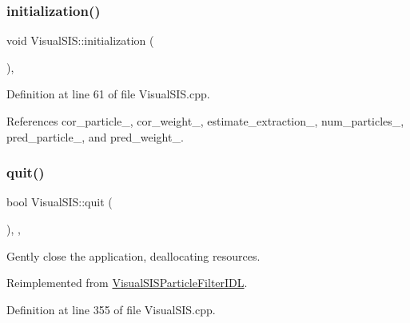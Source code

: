 \mbox{\label{classVisualSIS_a324f4b8554036b0d697423ea7ab865be}} 
\subsubsection{\texorpdfstring{initialization()}{initialization()}}
{\footnotesize\ttfamily void Visual\+S\+I\+S\+::initialization (\begin{DoxyParamCaption}{ }\end{DoxyParamCaption})\hspace{0.3cm}{\ttfamily [override]}, {\ttfamily [protected]}}



Definition at line 61 of file Visual\+S\+I\+S.\+cpp.



References cor\+\_\+particle\+\_\+, cor\+\_\+weight\+\_\+, estimate\+\_\+extraction\+\_\+, num\+\_\+particles\+\_\+, pred\+\_\+particle\+\_\+, and pred\+\_\+weight\+\_\+.

\mbox{\label{classVisualSIS_abff835a326f38e95187148d9401d5170}} 
\subsubsection{\texorpdfstring{quit()}{quit()}}
{\footnotesize\ttfamily bool Visual\+S\+I\+S\+::quit (\begin{DoxyParamCaption}{ }\end{DoxyParamCaption})\hspace{0.3cm}{\ttfamily [override]}, {\ttfamily [protected]}, {\ttfamily [virtual]}}



Gently close the application, deallocating resources. 



Reimplemented from \hyperlink{classVisualSISParticleFilterIDL_a3f02a3df0d3dd545a6c62dc3a9f002b4}{Visual\+S\+I\+S\+Particle\+Filter\+I\+DL}.



Definition at line 355 of file Visual\+S\+I\+S.\+cpp.

\mbox{\label{classVisualSISParticleFilterIDL_aade5ce77926faff0e94ffbf77f20c2c0}} 
